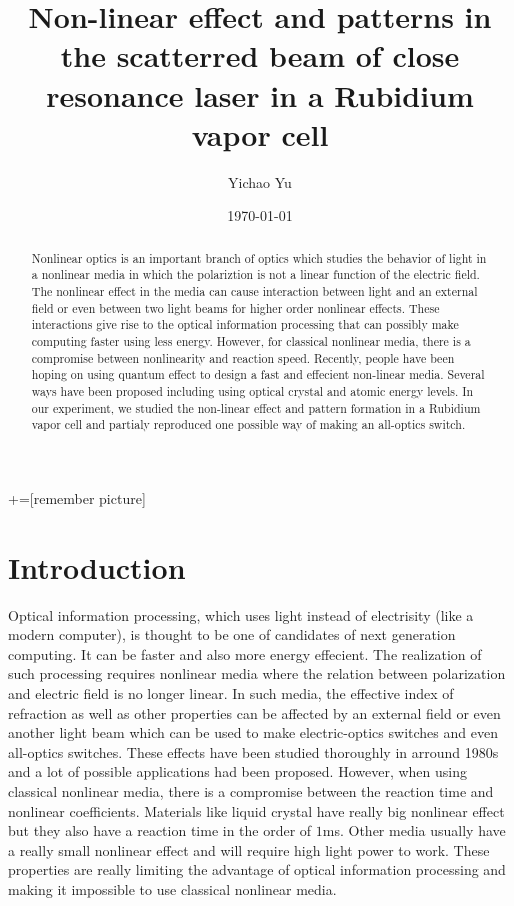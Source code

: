 \documentclass[aps,twocolumn,secnumarabic,balancelastpage,amsmath,amssymb,nofootinbib]{revtex4}
\begin{document}
+=[remember picture]
\title{Non-linear effect and patterns in the scatterred beam of close resonance laser in a Rubidium vapor cell}
\author{Yichao Yu}
\date{\today}

\begin{abstract}
  Nonlinear optics is an important branch of optics which studies the behavior of light in a nonlinear media in which the polariztion is not a linear function of the electric field. The nonlinear effect in the media can cause interaction between light and an external field or even between two light beams for higher order nonlinear effects. These interactions give rise to the optical information processing that can possibly make computing faster using less energy. However, for classical nonlinear media, there is a compromise between nonlinearity and reaction speed. Recently, people have been hoping on using quantum effect to design a fast and effecient non-linear media. Several ways have been proposed including using optical crystal and atomic energy levels. In our experiment, we studied the non-linear effect and pattern formation in a Rubidium vapor cell and partialy reproduced one possible way of making an all-optics switch.
\end{abstract}

\maketitle
\section*{Introduction}
Optical information processing, which uses light instead of electrisity (like a modern computer), is thought to be one of candidates of next generation computing. It can be faster and also more energy effecient. The realization of such processing requires nonlinear media where the relation between polarization and electric field is no longer linear. In such media, the effective index of refraction as well as other properties can be affected by an external field or even another light beam which can be used to make electric-optics switches and even all-optics switches. These effects have been studied thoroughly in arround 1980s and a lot of possible applications had been proposed. However, when using classical nonlinear media, there is a compromise between the reaction time and nonlinear coefficients. Materials like liquid crystal have really big nonlinear effect but they also have a reaction time in the order of $1$ms. Other media usually have a really small nonlinear effect and will require high light power to work. These properties are really limiting the advantage of optical information processing and making it impossible to use classical nonlinear media.
\end{document}
